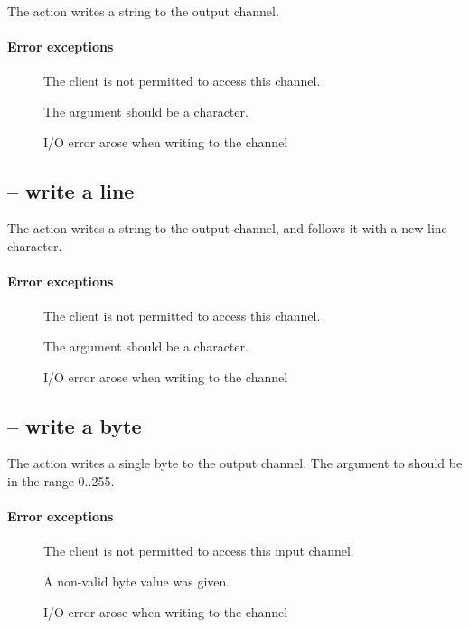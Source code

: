 
The  action writes a string to the output channel.

\paragraph{Error exceptions}
\begin{description}
\item[]
The client is not permitted to access this channel.
\item[]
The  argument should be a character.
\item[]
I/O error arose when writing to the channel
\end{description}

\subsection{ -- write a line}
\label{io:outLine}


The  action writes a string to the output channel, and follows it with a new-line character.

\paragraph{Error exceptions}
\begin{description}
\item[]
The client is not permitted to access this channel.
\item[]
The  argument should be a character.
\item[]
I/O error arose when writing to the channel
\end{description}

\subsection{ -- write a byte}
\label{io:outB}


The  action writes a single byte to the output channel. The argument to  should be in the range 0..255.

\paragraph{Error exceptions}
\begin{description}
\item[]
The client is not permitted to access this input channel.
\item[]
A non-valid byte value was given.
\item[]
I/O error arose when writing to the channel
\end{description}

